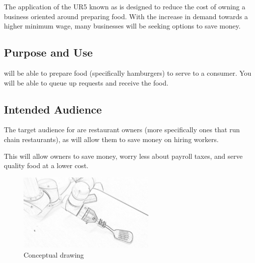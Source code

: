 The application of the UR5 known as \productname{} is designed to reduce the cost of owning a business oriented around preparing food. With the increase in demand towards a higher minimum wage, many businesses will be seeking options to save money.

\subsection{Purpose and Use}
\productname{} will be able to prepare food (specifically hamburgers) to serve to a consumer. You will be able to queue up requests and receive the food.  

\subsection{Intended Audience}
The target audience for \productname{} are restaurant owners (more specifically ones that run chain restaurants), as \productname{} will allow them to save money on hiring workers.

This will allow owners to save money, worry less about payroll taxes, and serve quality food at a lower cost.

\begin{figure}[h!]
	\centering
   	\includegraphics[width=0.60\textwidth]{images/test_image}
    \caption{Conceptual drawing}
\end{figure}
